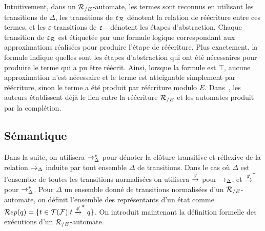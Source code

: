 
Intuitivement, dans un ${\mathcal R_{/E}}$-automate, les termes sont reconnus en utilisant les transitions de $\Delta$, les transitions de $\upvarepsilon_{\mathcal R}$ dénotent la relation de réécriture
entre ces termes, et les $\varepsilon$-transitions de $\upvarepsilon_{=}$ dénotent
les étapes d'abstraction. Chaque transition de $\upvarepsilon_{\mathcal R}$ est étiquetée par une formule logique
correspondant aux approximations réalisées pour produire l'étape de réécriture. 
Plus exactement, la formule indique quelles sont les étapes d'abstraction qui ont été nécessaires 
pour produire le terme qui a pu être réécrit. 
Ainsi, lorsque la formule est $\top$, aucune approximation n'est nécessaire et le terme
est atteignable simplement par réécriture, sinon le terme a été produit par réécriture 
modulo $E$. Dans~\cite{GenetR-JSC10}, les auteurs établissent déjà le lien entre la réécriture ${\mathcal R_{/E}}$
et les automates produit par la complétion.




\subsection{Sémantique}







Dans la suite, on utilisera $\rightarrow_\Delta^*$ pour dénoter la clôture transitive et réflexive de 
la relation $\rightarrow_\Delta$ induite par tout ensemble $\Delta$ de transitions. 
Dans le cas où $\Delta$ est l'ensemble de toutes les transitions normalisées on utilisera $\xrightarrow{\not\varepsilon}$ 
pour $\rightarrow_\Delta$, et $\xrightarrow{\not\varepsilon}^*$ pour $\rightarrow^*_\Delta$.
Pour $\Delta$ un ensemble donné de transitions normalisées d'un ${\mathcal R_{/E}}$-automate, 
on définit l'ensemble des représentants d'un état comme $\mathcal R ep(q) = \{ t \in \mathcal{T(F)} | t \xrightarrow{\not\varepsilon}^* q\}$. 
On introduit maintenant la définition formelle des exécutions d'un ${\mathcal R_{/E}}$-automate.

